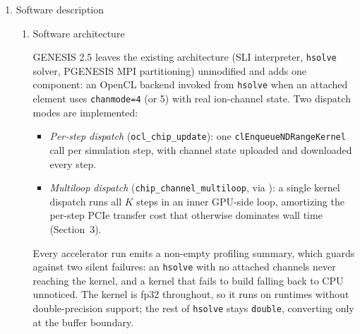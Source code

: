 \documentclass[preprint,12pt, a4paper]{elsarticle}
\newcommand{\ccm}{\texttt{chip\_\allowbreak channel\_\allowbreak multiloop}}
\begin{document}
\begin{enumerate}
We provide both OpenCL and CUDA rather than choosing one because they buy different things. OpenCL is vendor-neutral and runs on the integrated GPUs now shipped with ordinary workstations, including devices without double-precision support, which is why the kernel is written in fp32 throughout. CUDA targets the NVIDIA datacenter and desktop cards where most cluster time is available and where the toolchain and profiling tools are standard. Both sit behind one entry point, so a model and its SLI script are unchanged between them and the choice is a build flag.

We name this release ``2.5'' rather than ``3.0'' deliberately: ``GENESIS 3''~\cite{g3_dev_plans} produced independent successor lines (Neurospaces/Heccer~\cite{cornelis2011}, MOOSE) evolving into the CBI federation~\cite{cornelis2008cbi,cornelis2007dendrite,cornelis2013interop}, not a single artifact comparable to GENESIS 2.4. GENESIS 2.5 is not a re-architecture and targets existing GENESIS 2.4 deployments that should not need to migrate models or scripts to gain accelerator support.

\item Software description

\begin{enumerate}
    \item Software architecture

    GENESIS 2.5 leaves the existing architecture (SLI interpreter, \texttt{hsolve} solver, PGENESIS MPI partitioning) unmodified and adds one component: an OpenCL backend invoked from \texttt{hsolve} when an attached element uses \texttt{chanmode=4} (or 5) with real ion-channel state. Two dispatch modes are implemented:
    \begin{itemize}
        \item \emph{Per-step dispatch} (\texttt{ocl\_chip\_update}): one {\small\texttt{clEnqueue\allowbreak NDRange\allowbreak Kernel}} call per simulation step, with channel state uploaded and downloaded every step.
        \item \emph{Multiloop dispatch} (\ccm{}, via ): a single kernel dispatch runs all $K$ steps in an inner GPU-side loop, amortizing the per-step PCIe transfer cost that otherwise dominates wall time (Section~3).
    \end{itemize}
    Every accelerator run emits a non-empty profiling summary, which guards against two silent failures: an \texttt{hsolve} with no attached channels never reaching the kernel, and a kernel that fails to build falling back to CPU unnoticed. The kernel is fp32 throughout, so it runs on runtimes without double-precision support; the rest of \texttt{hsolve} stays \texttt{double}, converting only at the buffer boundary.


\end{enumerate}
\end{enumerate}
\end{document}
